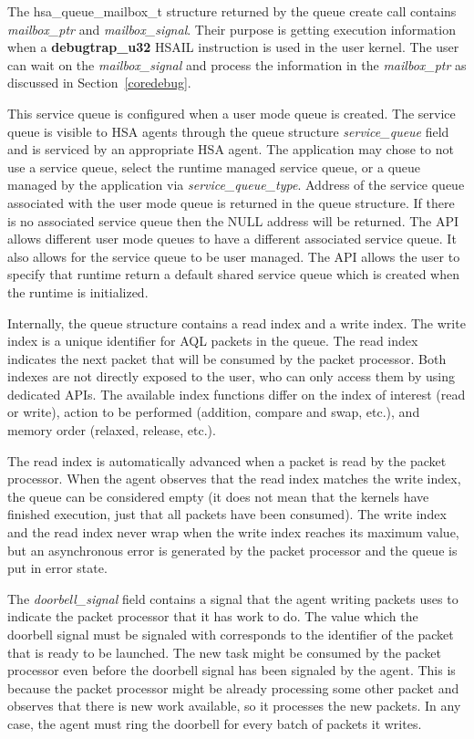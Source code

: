 \documentclass[draft]{book}
\newcommand{\mariotodo}[1]{\todo[color=CarnationPink]{#1}}
\newcommand{\reffun}[1]{\textbf{#1}}
\newcommand{\refarg}[1]{\textit{#1}}
\newcommand{\reffld}[1]{\textit{#1}}
\newcommand{\reftyp}[1]{#1}
\newcommand{\refhsl}[1]{\reffun{#1}}
\begin{document}
\mariotodo{I do not understand this paragraph}The \reftyp{hsa_queue_mailbox_t}
structure returned by the queue create call contains \reffld{mailbox_ptr} and
\reffld{mailbox_signal}. Their purpose is getting execution information when a
\refhsl{debugtrap_u32} HSAIL instruction is used in the user kernel. The user
can wait on the \reffld{mailbox_signal} and process the information in the
\reffld{mailbox_ptr} as discussed in Section~\ref{coredebug}.

\mariotodo{clarify service queues}This service queue is configured when a user
mode queue is created. The service queue is visible to HSA agents through the
queue structure \reffld{service_queue} field and is serviced by an appropriate
HSA agent. The application may chose to not use a service queue, select the
runtime managed service queue, or a queue managed by the application via
\refarg{service_queue_type}. Address of the service queue associated with the
user mode queue is returned in the queue structure. If there is no associated
service queue then the NULL address will be returned. The API allows different
user mode queues to have a different associated service queue. It also allows
for the service queue to be user managed. The API allows the user to specify
that runtime return a default shared service queue which is created when the
runtime is initialized.

Internally, the queue structure contains a read index and a write index. The
write index is a unique identifier for AQL packets in the queue. The read index
indicates the next packet that will be consumed by the packet processor. Both
indexes are not directly exposed to the user, who can only access them by using
dedicated APIs.  The available index functions differ on the index of interest
(read or write), action to be performed (addition, compare and swap, etc.), and
memory order (relaxed, release, etc.).

The read index is automatically advanced when a packet is read by the packet
processor. When the agent observes that the read index matches the write index,
the queue can be considered empty (it does not mean that the kernels have
finished execution, just that all packets have been consumed). The write index
and the read index never wrap when the write index reaches its maximum value,
but an asynchronous error is generated by the packet processor and the queue is
put in error state.

The \reffld{doorbell_signal} field contains a signal that the agent writing
packets uses to indicate the packet processor that it has work to do. The value
which the doorbell signal must be signaled with corresponds to the identifier of
the packet that is ready to be launched.  The new task might be consumed by the
packet processor even before the doorbell signal has been signaled by the
agent. This is because the packet processor might be already processing some
other packet and observes that there is new work available, so it processes the
new packets. In any case, the agent must ring the doorbell for every batch of
packets it writes.
\end{document}
